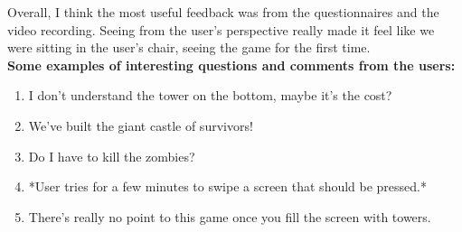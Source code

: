 \documentclass[oneside]{article}%
\begin{document}
Overall, I think the most useful feedback was from the questionnaires and the video recording.
Seeing from the user’s perspective really made it feel like we were sitting in the user’s chair,
seeing the game for the first time.\\

\textbf{Some examples of interesting questions and comments from the users:}\\

\begin{enumerate}
	\item I don't understand the tower on the bottom, maybe it's the cost?
	\item We've built the giant castle of survivors!
	\item Do I have to kill the zombies?
	\item *User tries for a few minutes to swipe a screen that should be pressed.*
	\item There's really no point to this game once you fill the screen with towers.
\end{enumerate}

%

\end{document}
